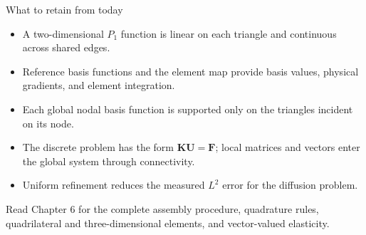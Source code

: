\documentclass[11pt,aspectratio=169]{beamer}
\newcommand{\bK}{\bm K}
\newcommand{\bF}{\bm F}
\newcommand{\bU}{\bm U}
\begin{document}
\begin{frame}{What to retain from today}
\begin{itemize}
  \item A two-dimensional $P_1$ function is linear on each triangle and
  continuous across shared edges.
  \item Reference basis functions and the element map provide basis values,
  physical gradients, and element integration.
  \item Each global nodal basis function is supported only on the triangles
  incident on its node.
  \item The discrete problem has the form $\bK\bU=\bF$; local matrices and
  vectors enter the global system through connectivity.
  \item Uniform refinement reduces the measured $L^2$ error for the diffusion
  problem.
\end{itemize}

\vspace{0.2cm}
Read Chapter 6 for the complete assembly procedure, quadrature rules,
quadrilateral and three-dimensional elements, and vector-valued elasticity.
\end{frame}
\end{document}
